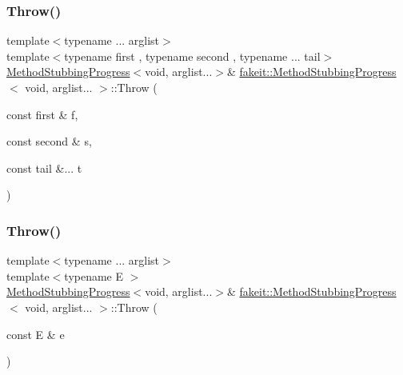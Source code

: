 \subsubsection{\texorpdfstring{Throw()}{Throw()}\hspace{0.1cm}{\footnotesize\ttfamily [21/27]}}
{\footnotesize\ttfamily template$<$typename ... arglist$>$ \\
template$<$typename first , typename second , typename ... tail$>$ \\
\mbox{\hyperlink{structfakeit_1_1MethodStubbingProgress}{Method\+Stubbing\+Progress}}$<$void, arglist...$>$\& \mbox{\hyperlink{structfakeit_1_1MethodStubbingProgress}{fakeit\+::\+Method\+Stubbing\+Progress}}$<$ void, arglist... $>$\+::Throw (\begin{DoxyParamCaption}\item[{const first \&}]{f,  }\item[{const second \&}]{s,  }\item[{const tail \&...}]{t }\end{DoxyParamCaption})\hspace{0.3cm}{\ttfamily [inline]}}

\mbox{\label{structfakeit_1_1MethodStubbingProgress_3_01void_00_01arglist_8_8_8_01_4_a8b0d920dc6424eadd7dce7cb9df66814}} 
\subsubsection{\texorpdfstring{Throw()}{Throw()}\hspace{0.1cm}{\footnotesize\ttfamily [22/27]}}
{\footnotesize\ttfamily template$<$typename ... arglist$>$ \\
template$<$typename E $>$ \\
\mbox{\hyperlink{structfakeit_1_1MethodStubbingProgress}{Method\+Stubbing\+Progress}}$<$void, arglist...$>$\& \mbox{\hyperlink{structfakeit_1_1MethodStubbingProgress}{fakeit\+::\+Method\+Stubbing\+Progress}}$<$ void, arglist... $>$\+::Throw (\begin{DoxyParamCaption}\item[{const E \&}]{e }\end{DoxyParamCaption})\hspace{0.3cm}{\ttfamily [inline]}}

